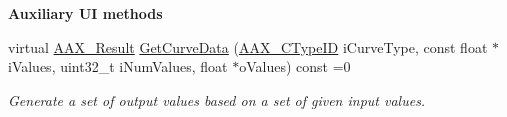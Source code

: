 \begin{Indent}{\bf Auxiliary U\+I methods}\par
\begin{DoxyCompactItemize}
\item 
virtual \hyperlink{a00149_a4d8f69a697df7f70c3a8e9b8ee130d2f}{A\+A\+X\+\_\+\+Result} \hyperlink{a00342_gaa85bda4027342eb644a9c92a17da6d49}{Get\+Curve\+Data} (\hyperlink{a00149_ac678f9c1fbcc26315d209f71a147a175}{A\+A\+X\+\_\+\+C\+Type\+I\+D} i\+Curve\+Type, const float $\ast$i\+Values, uint32\+\_\+t i\+Num\+Values, float $\ast$o\+Values) const =0
\begin{DoxyCompactList}\small\item\em Generate a set of output values based on a set of given input values. \end{DoxyCompactList}\end{DoxyCompactItemize}
\end{Indent}
